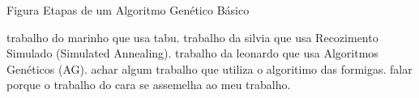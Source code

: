 Figura Etapas de um Algoritmo Genético Básico 

trabalho do marinho que usa tabu.
trabalho da silvia que usa Recozimento Simulado (Simulated Annealing).
trabalho da leonardo que usa Algoritmos Genéticos (AG).
achar algum trabalho que utiliza o algoritimo das formigas.
falar porque o trabalho do cara se assemelha ao meu trabalho.